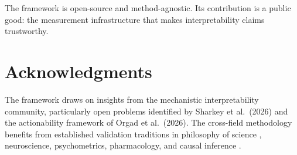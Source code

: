 \documentclass[10pt]{article}
\begin{document}
The framework is open-source and method-agnostic. Its contribution is a public good: the measurement infrastructure that makes interpretability claims trustworthy.

\section*{Acknowledgments}

The framework draws on insights from the mechanistic interpretability community, particularly open problems identified by Sharkey et al.\ (2026) and the actionability framework of Orgad et al.\ (2026). The cross-field methodology benefits from established validation traditions in philosophy of science \citep{mayo2018statistical}, neuroscience, psychometrics, pharmacology, and causal inference \citep{pearl2009causality}.


\end{document}
